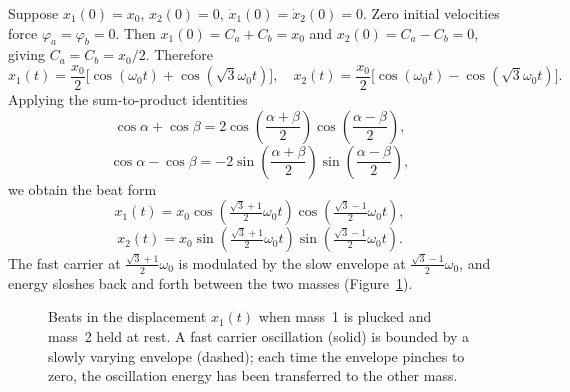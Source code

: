 \begin{example}
Suppose $x_1(0) = x_0$, $x_2(0) = 0$, $\dot{x}_1(0) = \dot{x}_2(0) = 0$. Zero initial velocities force $\varphi_a = \varphi_b = 0$. Then $x_1(0) = C_a + C_b = x_0$ and $x_2(0) = C_a - C_b = 0$, giving $C_a = C_b = x_0/2$. Therefore
\begin{equation}
    x_1(t) = \frac{x_0}{2}\bigl[\cos(\omega_0 t) + \cos(\sqrt{3}\omega_0 t)\bigr], \quad
    x_2(t) = \frac{x_0}{2}\bigl[\cos(\omega_0 t) - \cos(\sqrt{3}\omega_0 t)\bigr].
\end{equation}
Applying the sum-to-product identities
\begin{equation}
    \cos\alpha + \cos\beta = 2\cos\!\left(\frac{\alpha+\beta}{2}\right)\cos\!\left(\frac{\alpha-\beta}{2}\right),
\end{equation}
\begin{equation}
    \cos\alpha - \cos\beta = -2\sin\!\left(\frac{\alpha+\beta}{2}\right)\sin\!\left(\frac{\alpha-\beta}{2}\right),
\end{equation}
we obtain the beat form
\begin{equation}
    x_1(t) = x_0 \cos\!\left(\tfrac{\sqrt{3}+1}{2}\omega_0 t\right) \cos\!\left(\tfrac{\sqrt{3}-1}{2}\omega_0 t\right),
\end{equation}
\begin{equation}
    x_2(t) = x_0 \sin\!\left(\tfrac{\sqrt{3}+1}{2}\omega_0 t\right) \sin\!\left(\tfrac{\sqrt{3}-1}{2}\omega_0 t\right).
\end{equation}
The fast carrier at $\frac{\sqrt{3}+1}{2}\omega_0$ is modulated by the slow envelope at $\frac{\sqrt{3}-1}{2}\omega_0$, and energy sloshes back and forth between the two masses (Figure~\ref{fig:coupled-beats}).
\end{example}

\begin{figure}[h]
\centering
{}
\caption{Beats in the displacement $x_1(t)$ when mass~1 is plucked and mass~2 held at rest. A fast carrier oscillation (solid) is bounded by a slowly varying envelope (dashed); each time the envelope pinches to zero, the oscillation energy has been transferred to the other mass.}
\label{fig:coupled-beats}
\end{figure}

